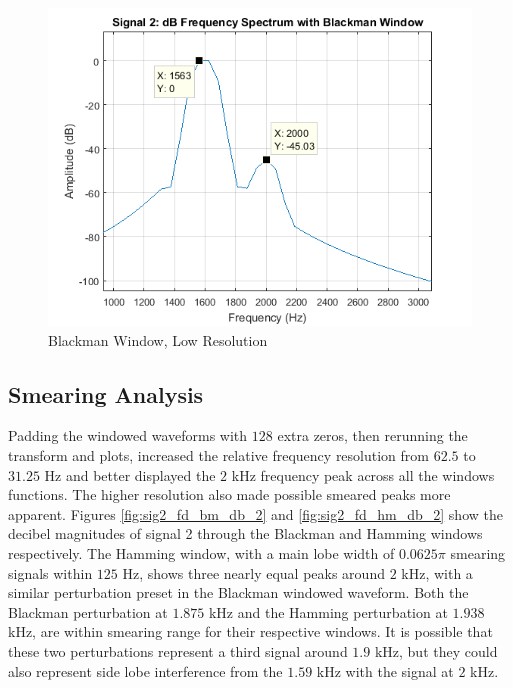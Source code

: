\documentclass[pdftex, 10pt]{IEEEtran}
\begin{document}
\begin{figure}
    \centering
    \includegraphics[scale=0.5]{sig2_fd_bm_db_1}
    \caption{Blackman Window, Low Resolution}
    \label{fig:sig2_fd_bm_db_1}
\end{figure}

\subsection{Smearing Analysis}
Padding the windowed waveforms with $128$ extra zeros, then rerunning the transform
and plots, increased the relative frequency resolution from $62.5$ to $31.25$ Hz and better displayed the $2$ kHz
frequency peak across all the windows functions. The higher resolution also made possible smeared peaks more apparent.
Figures \ref{fig:sig2_fd_bm_db_2} and \ref{fig:sig2_fd_hm_db_2} 
show the decibel magnitudes of signal 2 through the Blackman and Hamming windows respectively. The Hamming window,
with a main lobe width of $0.0625\pi$ smearing signals within $125$ Hz, shows three nearly equal peaks around 
$2$ kHz, with a similar perturbation preset in the Blackman windowed waveform. Both the Blackman perturbation at 
$1.875$ kHz and the Hamming perturbation at $1.938$ kHz, are within smearing range for their respective windows.
It is possible that these two perturbations represent a third signal around $1.9$ kHz, but they could also represent
side lobe interference from the $1.59$ kHz with the signal at $2$ kHz.
\end{document}
